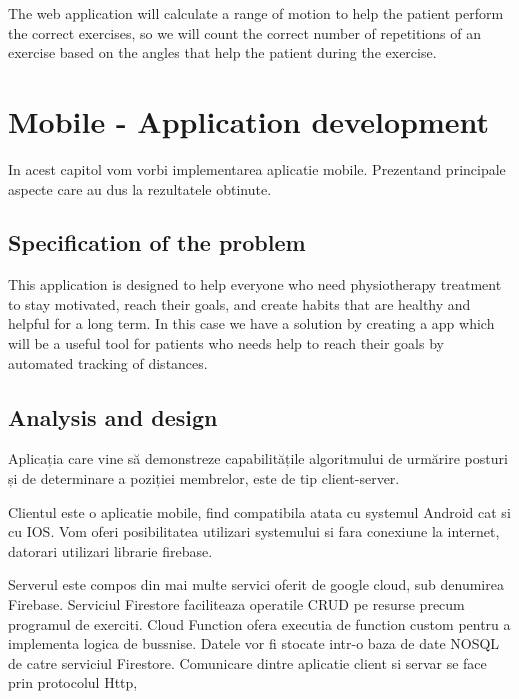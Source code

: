 The web application will calculate a range of motion to help the patient perform the correct exercises, so we will count the correct number of repetitions of an exercise based on the angles that help the patient during the exercise.

\section{Mobile - Application development}

In acest capitol vom vorbi implementarea aplicatie mobile. Prezentand principale aspecte care au dus la rezultatele obtinute.


\subsection{Specification of the problem}
 
\par This application is designed to help everyone who need physiotherapy treatment to stay motivated,
 reach their goals, and create habits that are healthy and helpful for a long term. 
 In this case we have a solution by creating a app which will be a useful tool for patients who needs help 
 to reach their goals by automated tracking of distances.
 
 
\subsection{Analysis and design}
Aplicația care vine să demonstreze capabilitățile algoritmului de urmărire posturi și de determinare a poziției membrelor, este de tip client-server.

Clientul este o aplicatie mobile, find compatibila atata cu systemul Android cat si cu IOS. 
Vom oferi posibilitatea utilizari systemului si fara conexiune la internet, datorari utilizari librarie firebase.

Serverul este compos din mai multe servici oferit de google cloud, sub denumirea Firebase. Serviciul Firestore faciliteaza operatile CRUD pe resurse precum programul de exerciti. Cloud Function ofera  executia de function custom pentru a implementa logica de bussnise. Datele vor fi stocate intr-o baza de date NOSQL de catre serviciul Firestore. Comunicare dintre aplicatie client si servar se face prin protocolul Http, 

